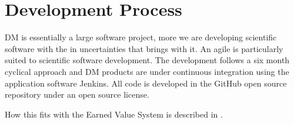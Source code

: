 \section{Development Process} \label{sect:devproc}

DM is essentially a large software project, more we are developing scientific software with the in uncertainties that brings with it. 
An agile \citep{it:agile} is particularly suited to scientific software development.  The development follows a six month  cyclical approach and  DM  products are under continuous
integration using the application software Jenkins. All code is developed in the GitHub open source repository under an open source license.

How this fits with the Earned Value System is described in .
